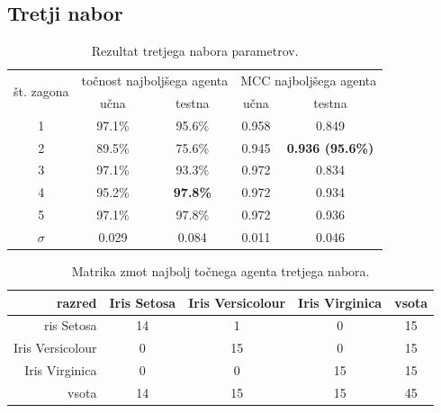 \subsection{Tretji nabor}\label{subsec:dodatek-iris-tretji-nabor}
\begin{table}[H]
    \begin{center}
        \begin{tabular}{|| c | c c || c c ||}
            \hline
            \multirow{2}{*}{št. zagona} & \multicolumn{2}{c||}{točnost najboljšega agenta} & \multicolumn{2}{c||}{MCC najboljšega agenta} \\ \cline{2-5}
            & učna   & testna          & učna  & testna                  \\
            \hline
            1        & 97.1\% & 95.6\%          & 0.958 & 0.849                   \\
            \hline
            2        & 89.5\% & 75.6\%          & 0.945 & \textbf{0.936 (95.6\%)} \\
            \hline
            3        & 97.1\% & 93.3\%          & 0.972 & 0.834                   \\
            \hline
            4        & 95.2\% & \textbf{97.8\%} & 0.972 & 0.934                   \\
            \hline
            5        & 97.1\% & 97.8\%          & 0.972 & 0.936                   \\
            \hline
            $\sigma$ & 0.029  & 0.084           & 0.011 & 0.046                   \\
            \hline
        \end{tabular}
    \end{center}
    \caption{Rezultat tretjega nabora parametrov.}
    \label{tab:iris_result_3}
\end{table}

\begin{table}[H]
    \centering
    \begin{tabular}{||rcccc||}
        \hline
        razred           & Iris Setosa & Iris Versicolour & Iris Virginica & vsota \\ \hline
        ris Setosa       & 14          & 1                & 0              & 15    \\ \hline
        Iris Versicolour & 0           & 15               & 0              & 15    \\ \hline
        Iris Virginica   & 0           & 0                & 15             & 15    \\ \hline
        vsota            & 14          & 15               & 15             & 45    \\ \hline
    \end{tabular}
    \caption{Matrika zmot najbolj točnega agenta tretjega nabora.}
    \label{tab:iris_acc_3}
\end{table}

